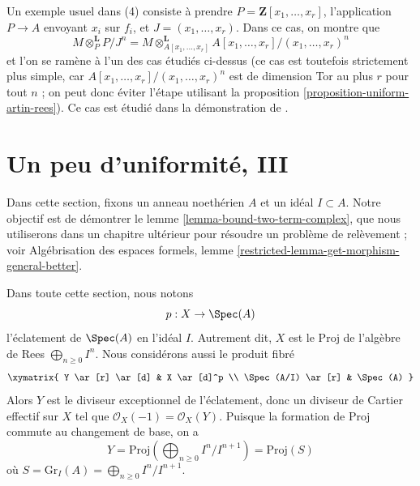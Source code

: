 \begin{remark}
\medskip\noindent
Un exemple usuel dans (4) consiste à prendre $P = \mathbf{Z}[x_1, \ldots, x_r]$, l'application $P \to A$ envoyant $x_i$ sur $f_i$, et $J = (x_1, \ldots, x_r)$. Dans ce cas, on montre que
$$
M \otimes_P^\mathbf{L} P/J^n =
M \otimes_{A[x_1, \ldots, x_r]}^\mathbf{L}
A[x_1, \ldots, x_r]/(x_1, \ldots, x_r)^n
$$
et l'on se ramène à l'un des cas étudiés ci-dessus (ce cas est toutefois strictement plus simple, car $A[x_1, \ldots, x_r]/(x_1, \ldots, x_r)^n$ est de dimension Tor au plus $r$ pour tout $n$ ; on peut donc éviter l'étape utilisant la proposition \ref{proposition-uniform-artin-rees}). Ce cas est étudié dans la démonstration de \cite[Proposition 3.5.1]{BS}.
\end{remark}








\section{Un peu d'uniformité, III}
\label{section-uniform}

\noindent
Dans cette section, fixons un anneau noethérien $A$ et un idéal $I \subset A$. Notre objectif est de démontrer le lemme \ref{lemma-bound-two-term-complex}, que nous utiliserons dans un chapitre ultérieur pour résoudre un problème de relèvement ; voir Algébrisation des espaces formels, lemme \ref{restricted-lemma-get-morphism-general-better}.

\medskip\noindent
Dans toute cette section, nous notons
$$
p : X \to \Spec(A)
$$
l'éclatement de $\Spec(A)$ en l'idéal $I$. Autrement dit, $X$ est le $\text{Proj}$ de l'algèbre de Rees $\bigoplus_{n \geq 0} I^n$. Nous considérons aussi le produit fibré
$$
\xymatrix{
Y \ar[r] \ar[d] & X \ar[d]^p \\
\Spec(A/I) \ar[r] & \Spec(A)
}
$$
Alors $Y$ est le diviseur exceptionnel de l'éclatement, donc un diviseur de Cartier effectif sur $X$ tel que $\mathcal{O}_X(-1) = \mathcal{O}_X(Y)$. Puisque la formation de $\text{Proj}$ commute au changement de base, on a
$$
Y = \text{Proj}(\bigoplus\nolimits_{n \geq 0} I^n/I^{n + 1}) = \text{Proj}(S)
$$
où $S = \text{Gr}_I(A) = \bigoplus_{n \geq 0} I^n/I^{n + 1}$.

